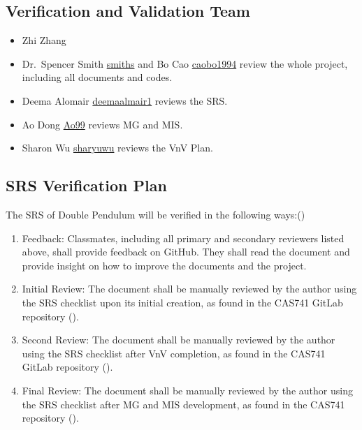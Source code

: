 \documentclass[12pt, titlepage]{article}
\begin{document}
\subsection{Verification and Validation Team}

\begin{itemize}
    \item Zhi Zhang
    \item Dr.~Spencer Smith \href{https://github.com/smiths}{smiths} and Bo Cao \href{https://github.com/caobo1994}{caobo1994} review the whole project, including all documents and codes.
    \item Deema Alomair \href{https://github.com/deemaalomair1}{deemaalmair1} reviews the SRS. 
    \item Ao Dong \href{https://github.com/Ao99}{Ao99} reviews MG and MIS. 
    \item Sharon Wu \href{https://github.com/sharyuwu}{sharyuwu} reviews the VnV Plan. 
\end{itemize}


\subsection{SRS Verification Plan}
The SRS of Double Pendulum will be verified in the following ways:(\cite{SystVnVPlan})

\begin{enumerate}
\item Feedback: Classmates, including all primary and secondary reviewers listed above, shall provide feedback on GitHub. They shall read the document and provide insight on how to improve the documents and the project.  
\item Initial Review: The document shall be manually reviewed by the author
  using the SRS checklist upon its initial creation, as found in the CAS741
  GitLab repository (\citet{CAS741_SRS_checklist}). 
\item Second Review: The document shall be manually reviewed by the author using the SRS checklist after VnV completion, as found in the CAS741 GitLab repository (\citet{CAS741_SRS_checklist}). 
\item Final Review: The document shall be manually reviewed by the author using the SRS checklist after MG and MIS development, as found in the CAS741 repository (\citet{CAS741_SRS_checklist}).  
\end{enumerate}
 
\end{document}
